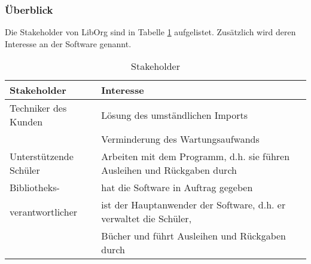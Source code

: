 \subsubsection{Überblick}
Die Stakeholder von LibOrg sind in Tabelle \ref{tab:Stakeholder} aufgelistet. Zusätzlich wird deren Interesse an der Software genannt.
\begin{table}[htb]
	\centering
	\caption{Stakeholder}
	\label{tab:Stakeholder}
		\begin{tabular}{|l|l|}
			\hline
			Stakeholder & Interesse \\ \hline
			Techniker des Kunden & \textbullet{} Lösung des umständlichen Imports\\
				& \textbullet{} Verminderung des Wartungsaufwands \\ \hline
			Unterstützende Schüler & 	\textbullet{} Arbeiten mit dem Programm, d.h. sie führen Ausleihen und Rückgaben durch \\ \hline
			Bibliotheks- & \textbullet{} hat die Software in Auftrag gegeben \\ 
			verantwortlicher &	\textbullet{} ist der Hauptanwender der Software, d.h. er verwaltet die Schüler, \\
			& Bücher und führt Ausleihen und Rückgaben durch \\ \hline
		\end{tabular}
\end{table}

